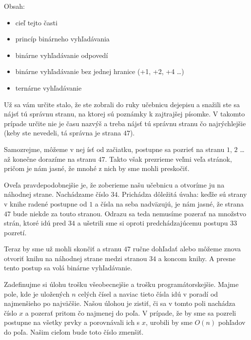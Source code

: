 







Obsah:
\begin{itemize}
    \item cieľ tejto časti
    \item princíp binárneho vyhľadávania
    \item binárne vyhľadávanie odpovedí
    \item binárne vyhľadávanie bez jednej hranice (+1, +2, +4 \dots)
    \item ternárne vyhľadávanie
\end{itemize}

Už sa vám určite stalo, že ste zobrali do ruky učebnicu dejepisu a snažili ste sa nájsť tú správnu stranu, na
ktorej sú poznámky k zajtrajšej písomke. V takomto prípade určite nie je času nazvýš a treba nájsť
tú správnu stranu čo najrýchlejšie (keby ste nevedeli, tá správna je strana $47$).

Samozrejme, môžeme v nej ísť od začiatku, postupne sa pozrieť na stranu $1$, $2$ \dots až
konečne dorazíme na stranu $47$. Takto však prezrieme veľmi veľa stránok, pričom je nám jasné, že
mnohé z nich by sme mohli preskočiť.

Oveľa pravdepodobnejšie je, že zoberieme našu učebnicu a otvoríme ju na náhodnej strane. Nachádzame
číslo $34$. Prichádza dôležitá úvaha: keďže sú strany v knihe radené postupne od $1$ a čísla na
seba nadväzujú, je nám jasné, že strana $47$ bude niekde za touto stranou. Odrazu sa teda nemusíme
pozerať na množstvo strán, ktoré idú pred $34$ a ušetrili sme si oproti predchádzajúcemu postupu
$33$ pozretí.

Teraz by sme už mohli skončiť a stranu $47$ ručne dohľadať alebo môžeme znova otvoriť knihu na
náhodnej strane medzi stranou $34$ a koncom knihy. A presne tento postup sa volá binárne
vyhľadávanie.

\medskip

Zadefinujme si úlohu trošku všeobecnejšie a trošku programátorskejšie. Majme pole, kde je uložených
$n$ celých čísel a naviac tieto čísla idú v poradí od najmenšieho po najväčšie. Našou úlohou je
zistiť, či sa v tomto poli nachádza číslo $x$ a pozerať pritom čo najmenej do poľa. V
prípade, že by sme sa pozreli postupne na všetky prvky a porovnávali ich s $x$, urobili by sme
$O(n)$ pohľadov do poľa. Našim cieľom bude toto číslo zmenšiť.

